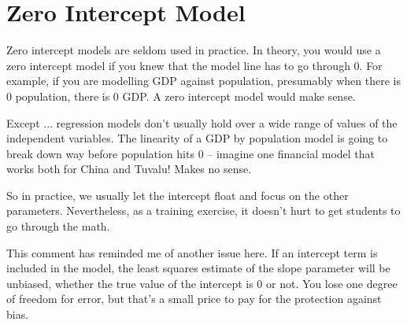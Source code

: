 \documentclass[MASTER.tex]{subfiles}
\begin{document}
\newpage
\section{Zero Intercept Model}
Zero intercept models are seldom used in practice. In theory, you would use a zero intercept model if you knew that the model line has to go through 0. For example, if you are modelling GDP against population, presumably when there is 0 population, there is 0 GDP. A zero intercept model would make sense.

Except ... regression models don't usually hold over a wide range of values of the independent variables. The linearity of a GDP by population model is going to break down way before population hits 0 -- imagine one financial model that works both for China and Tuvalu! Makes no sense.

So in practice, we usually let the intercept float and focus on the other parameters. Nevertheless, as a training exercise, it doesn't hurt to get students to go through the math.

This comment has reminded me of another issue here. If an intercept term is included in the model, the least squares estimate of the slope parameter will be unbiased, whether the true value of the intercept is 0 or not. You lose one degree of freedom for error, but that's a small price to pay for the protection against bias.
\end{document}
